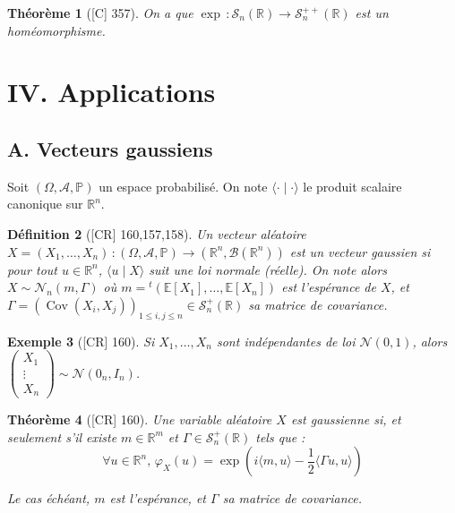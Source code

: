 \documentclass[10pt, a4paper, parskip=full, twoside, twocolumn]{report}
\newtheorem{definition}{Définition}
\newtheorem{theorem}[definition]{Théorème}
\newtheorem{example}[definition]{Exemple}
\newcommand{\IP}{\mathbb{P}}
\newcommand{\IE}{\mathbb{E}}
\newcommand{\IR}{\mathbb{R}}
\newcommand{\B}{\mathcal{B}}
\newcommand{\A}{\mathscr{A}}
\DeclareMathOperator{\Cov}{Cov}
\begin{document}
\begin{tcolorbox}[
    breakable, %
    colback=developpement, %
    colframe=gray!0!black, %
    boxrule=0pt, %
    arc=1mm, %
	boxsep=0pt,
	left=0pt, right=0pt, top=0pt, bottom=0pt
]
\begin{theorem}[\textnormal{[C] 357}]
	\label{157dev2}
	On a que $\exp\,\colon \mathcal{S}_n(\IR)\to \mathcal{S}_n^{++}(\IR)$ est un homéomorphisme.
\end{theorem}
\end{tcolorbox}

\section*{IV. Applications}
\subsection*{A. Vecteurs gaussiens}

\textcolor{paragraphtext}{Soit $(\Omega,\A,\IP)$ un espace probabilisé. On note $\langle\cdot\mid\cdot\rangle$ le produit scalaire canonique sur $\IR^n$.}

\begin{definition}[\textnormal{[CR] 160,157,158}]
	Un vecteur aléatoire $X=(X_1,\dots, X_n)\,\colon (\Omega,\A,\IP)\to (\IR^n,\B(\IR^n))$ est un \emph{vecteur gaussien} si pour tout $u\in\IR^n$, $\langle u\mid X\rangle$
	suit une loi normale (réelle). On note alors $X\sim \mathcal{N}_n(m,\Gamma)$ où $m = {}^t(\IE[X_1],\dots, \IE[X_n])$ est l'espérance de $X$, 
	et $\Gamma = \left(\Cov(X_i,X_j)\right)_{1\leq i,j\leq n}\in\mathcal{S}_n^+(\IR)$ sa matrice de covariance.
\end{definition}

\begin{example}[\textnormal{[CR] 160}]
	Si $X_1,\dots,X_n$ sont indépendantes de loi $\mathcal{N}(0,1)$, alors $\begin{pmatrix}
		X_1 \\ \vdots \\ X_n
	\end{pmatrix}\sim \mathcal{N}(0_n, I_n)$.
\end{example}

\begin{theorem}[\textnormal{[CR] 160}]
	Une variable aléatoire $X$ est gaussienne si, et seulement s'il existe $m\in\IR^m$ et $\Gamma\in\mathcal{S}_n^+(\IR)$ tels que :
	$$\forall u\in\IR^n,\,\varphi_X(u) = \exp(i\langle m,u\rangle - \frac{1}{2}\langle\Gamma u, u\rangle)$$

	Le cas échéant, $m$ est l'espérance, et $\Gamma$ sa matrice de covariance.
\end{theorem}
\end{document}
